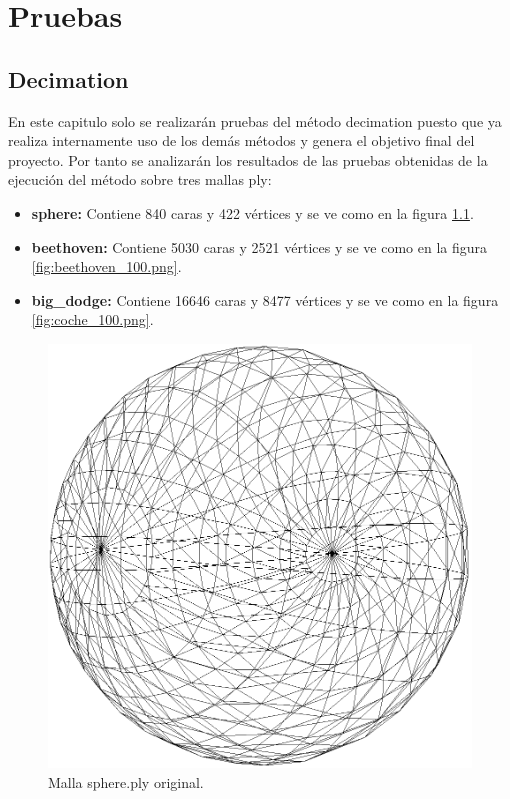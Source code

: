 \chapter{ Pruebas}

\section{ Decimation}
En este capitulo solo se realizarán pruebas del método decimation puesto que ya realiza internamente uso de los demás métodos y genera el objetivo final del proyecto. Por tanto se analizarán los resultados de las pruebas obtenidas de la ejecución del método sobre tres mallas ply:
\begin{itemize}
	\item \textbf{sphere:} Contiene 840 caras y 422 vértices y se ve como en la figura \ref{fig:esfera_100.png}.
	\item \textbf{beethoven:} Contiene 5030 caras y 2521 vértices y se ve como en la figura \ref{fig:beethoven_100.png}.
	\item \textbf{big\_dodge:} Contiene 16646 caras y 8477 vértices y se ve como en la figura \ref{fig:coche_100.png}.
\end{itemize} 

\begin{figure} %
	\centering
	\includegraphics[scale=0.25]{imagenes/esfera_100.png} 
	\caption{Malla sphere.ply original.} \label{fig:esfera_100.png}
\end{figure}

